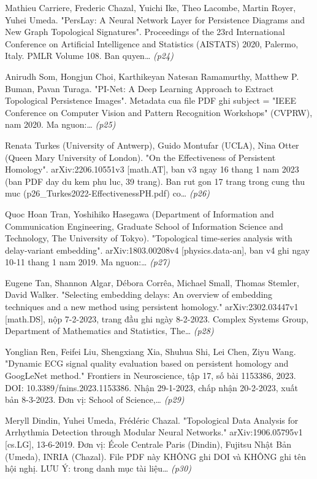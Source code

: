 \begin{enumerate}[leftmargin=1.6em,itemsep=2pt,label={[\arabic*]}]
\item {\small Mathieu Carriere, Frederic Chazal, Yuichi Ike, Theo Lacombe, Martin Royer, Yuhei Umeda. "PersLay: A Neural Network Layer for Persistence Diagrams and New Graph Topological Signatures". Proceedings of the 23rd International Conference on Artificial Intelligence and Statistics (AISTATS) 2020, Palermo, Italy. PMLR Volume 108. Ban quyen…} \hfill{\scriptsize\itshape (p24)}
\item {\small Anirudh Som, Hongjun Choi, Karthikeyan Natesan Ramamurthy, Matthew P. Buman, Pavan Turaga. "PI-Net: A Deep Learning Approach to Extract Topological Persistence Images". Metadata cua file PDF ghi subject = "IEEE Conference on Computer Vision and Pattern Recognition Workshops" (CVPRW), nam 2020. Ma nguon:…} \hfill{\scriptsize\itshape (p25)}
\item {\small Renata Turkes (University of Antwerp), Guido Montufar (UCLA), Nina Otter (Queen Mary University of London). "On the Effectiveness of Persistent Homology". arXiv:2206.10551v3 [math.AT], ban v3 ngay 16 thang 1 nam 2023 (ban PDF day du kem phu luc, 39 trang). Ban rut gon 17 trang trong cung thu muc (p26\_Turkes2022-EffectivenessPH.pdf) co…} \hfill{\scriptsize\itshape (p26)}
\item {\small Quoc Hoan Tran, Yoshihiko Hasegawa (Department of Information and Communication Engineering, Graduate School of Information Science and Technology, The University of Tokyo). "Topological time-series analysis with delay-variant embedding". arXiv:1803.00208v4 [physics.data-an], ban v4 ghi ngay 10-11 thang 1 nam 2019. Ma nguon:…} \hfill{\scriptsize\itshape (p27)}
\item {\small Eugene Tan, Shannon Algar, Débora Corrêa, Michael Small, Thomas Stemler, David Walker. "Selecting embedding delays: An overview of embedding techniques and a new method using persistent homology." arXiv:2302.03447v1 [math.DS], nộp 7-2-2023, trang đầu ghi ngày 8-2-2023. Complex Systems Group, Department of Mathematics and Statistics, The…} \hfill{\scriptsize\itshape (p28)}
\item {\small Yonglian Ren, Feifei Liu, Shengxiang Xia, Shuhua Shi, Lei Chen, Ziyu Wang. "Dynamic ECG signal quality evaluation based on persistent homology and GoogLeNet method." Frontiers in Neuroscience, tập 17, số bài 1153386, 2023. DOI: 10.3389/fnins.2023.1153386. Nhận 29-1-2023, chấp nhận 20-2-2023, xuất bản 8-3-2023. Đơn vị: School of Science,…} \hfill{\scriptsize\itshape (p29)}
\item {\small Meryll Dindin, Yuhei Umeda, Frédéric Chazal. "Topological Data Analysis for Arrhythmia Detection through Modular Neural Networks." arXiv:1906.05795v1 [cs.LG], 13-6-2019. Đơn vị: École Centrale Paris (Dindin), Fujitsu Nhật Bản (Umeda), INRIA (Chazal). File PDF này KHÔNG ghi DOI và KHÔNG ghi tên hội nghị. LƯU Ý: trong danh mục tài liệu…} \hfill{\scriptsize\itshape (p30)}

\end{enumerate}
